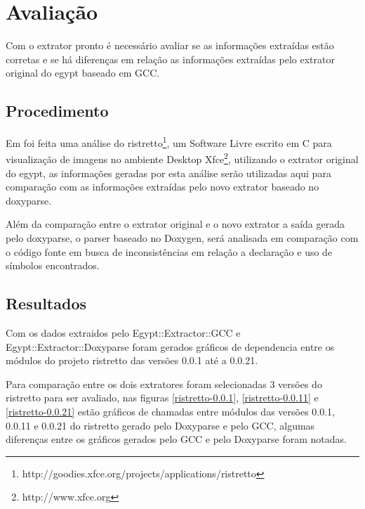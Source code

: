 \chapter{Avaliação}

Com o extrator pronto é necessário avaliar se as informações extraídas estão
corretas e se há diferenças em relação as informações extraídas pelo extrator
original do egypt baseado em GCC.

\section{Procedimento}

Em \cite{StructuralComplexityEvolution} foi feita uma análise do
ristretto\footnote{http://goodies.xfce.org/projects/applications/ristretto}, um
Software Livre escrito em C para visualização de imagens no ambiente Desktop
Xfce\footnote{http://www.xfce.org}, utilizando o extrator original do egypt, as
informações geradas por esta análise serão utilizadas aqui para comparação com
as informações extraídas pelo novo extrator baseado no doxyparse.

Além da comparação entre o extrator original e o novo extrator a saída
gerada pelo doxyparse, o parser baseado no Doxygen, será analisada em
comparação com o código fonte em busca de inconsistências em relação a
declaração e uso de símbolos encontrados.

\section{Resultados}

Com os dados extraidos pelo Egypt::Extractor::GCC e Egypt::Extractor::Doxyparse
foram gerados gráficos de dependencia entre os módulos do projeto ristretto das
versões 0.0.1 até a 0.0.21.

Para comparação entre os dois extratores foram selecionadas 3 versões do
ristretto para ser avaliado, nas figuras \ref{ristretto-0.0.1},
\ref{ristretto-0.0.11} e \ref{ristretto-0.0.21} estão gráficos de chamadas
entre módulos das versões 0.0.1, 0.0.11 e 0.0.21 do ristretto gerado pelo
Doxyparse e pelo GCC, algumas diferenças entre os gráficos gerados pelo GCC e
pelo Doxyparse foram notadas. 

